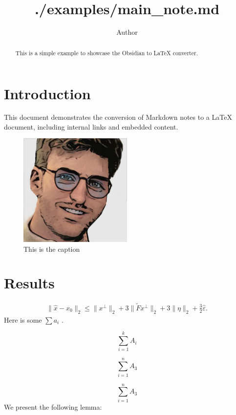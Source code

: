 \documentclass{article}
\title{./examples/main_note.md}
\author{Author}
\begin{document}
\maketitle
\begin{abstract}
This is a simple example to showcase the Obsidian to LaTeX converter.


\end{abstract}

\section{Introduction}
\label{section:Introduction}
This document demonstrates the conversion of Markdown notes to a LaTeX document, including internal links and embedded content.

\begin{figure}[h]
\caption{This is the caption}
\centering
\includegraphics[width=0.5\textwidth]{./Files/download.jpeg}
\end{figure}


\section{Results}
\label{section:Results}

\begin{align*}
  \|\hat x - x_0\|_2
  \leq \|x^\perp\|_2 + 3\|\tilde{F}x^\perp\|_2 + 3 \|\eta\|_2 + \frac{3}{2}\hat\varepsilon.
\end{align*}
Here is some  $\sum a_i$ .

\begin{equation*}
\sum_{i=1}^k A_i
\end{equation*}

\begin{equation*}
\sum_{i=1}^n A_3
\end{equation*}

\begin{equation*}
\sum_{i=1}^n A_3
\end{equation*}
We present the following lemma:
\end{document}
